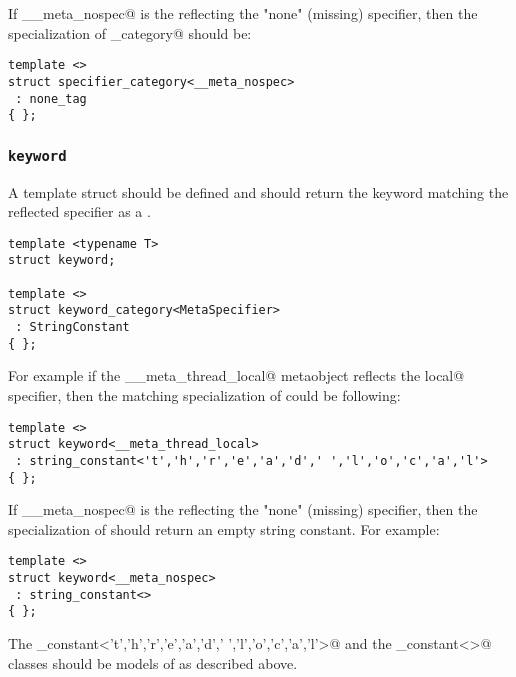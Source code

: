 If \verb@__meta_nospec@ is the  reflecting the "none" (missing) specifier,
then the specialization of \verb@specifier_category@ should be:

\begin{verbatim}
template <>
struct specifier_category<__meta_nospec>
 : none_tag
{ };
\end{verbatim}


\subsubsection{\texttt{keyword}}

A template struct \verb@keyword@ should be defined and should return
the keyword matching the reflected specifier as a
.

\begin{verbatim}
template <typename T>
struct keyword;

template <>
struct keyword_category<MetaSpecifier>
 : StringConstant
{ };
\end{verbatim}

For example if the \verb@__meta_thread_local@ metaobject reflects the \verb@thread local@
specifier, then the matching specialization of \verb@keyword@ could be following:

\begin{verbatim}
template <>
struct keyword<__meta_thread_local>
 : string_constant<'t','h','r','e','a','d',' ','l','o','c','a','l'>
{ };
\end{verbatim}

If \verb@__meta_nospec@ is the  reflecting the "none" (missing) specifier,
then the specialization of \verb@keyword@ should return an empty string constant.
For example:

\begin{verbatim}
template <>
struct keyword<__meta_nospec>
 : string_constant<>
{ };
\end{verbatim}

The \verb@string_constant<'t','h','r','e','a','d',' ','l','o','c','a','l'>@
and the \verb@string_constant<>@ classes should be models of 
as described above.

